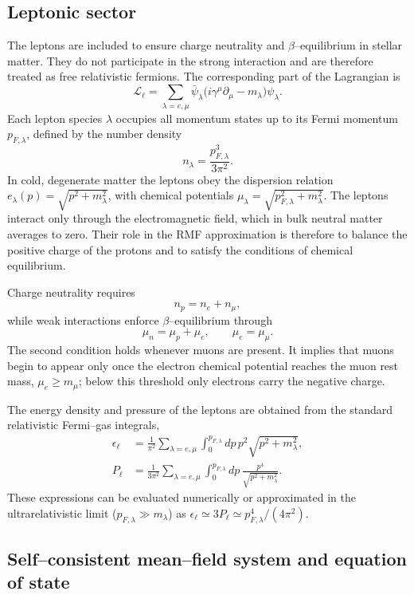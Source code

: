 \subsection*{Leptonic sector}
\label{subsec:leptons}

The leptons are included to ensure charge neutrality and
$\beta$–equilibrium in stellar matter. They do not participate in the strong
interaction and are therefore treated as free relativistic fermions. The
corresponding part of the Lagrangian is
\[
\mathcal{L}_{\ell}
= \sum_{\lambda=e,\mu}
  \bar{\psi}_{\lambda}\bigl(i\gamma^{\mu}\partial_{\mu}
  - m_{\lambda}\bigr)\psi_{\lambda}.
\]
Each lepton species $\lambda$ occupies all momentum states up to its Fermi
momentum $p_{F,\lambda}$, defined by the number density
\[
n_{\lambda} = \frac{p_{F,\lambda}^{3}}{3\pi^{2}}.
\]
In cold, degenerate matter the leptons obey the dispersion relation
$e_{\lambda}(p)=\sqrt{p^{2}+m_{\lambda}^{2}}$, with chemical potentials
$\mu_{\lambda}=\sqrt{p_{F,\lambda}^{2}+m_{\lambda}^{2}}$. The leptons interact
only through the electromagnetic field, which in bulk neutral matter averages
to zero. Their role in the RMF approximation is therefore to balance the
positive charge of the protons and to satisfy the conditions of chemical
equilibrium.

Charge neutrality requires
\[
n_{p} = n_{e} + n_{\mu},
\]
while weak interactions enforce $\beta$–equilibrium through
\[
\mu_{n} = \mu_{p} + \mu_{e}, \qquad
\mu_{e} = \mu_{\mu}.
\]
The second condition holds whenever muons are present. It implies that muons
begin to appear only once the electron chemical potential reaches the muon rest
mass, $\mu_{e} \ge m_{\mu}$; below this threshold
only electrons carry the negative charge.

The energy density and pressure of the leptons are obtained from the standard
relativistic Fermi–gas integrals,
\begin{align}
\epsilon_{\ell}
&= \frac{1}{\pi^{2}}\sum_{\lambda=e,\mu}
   \int_{0}^{p_{F,\lambda}}\!dp\,p^{2}\sqrt{p^{2}+m_{\lambda}^{2}},
\\[0.4em]
P_{\ell}
&= \frac{1}{3\pi^{2}}\sum_{\lambda=e,\mu}
   \int_{0}^{p_{F,\lambda}}\!dp\,\frac{p^{4}}{\sqrt{p^{2}+m_{\lambda}^{2}}}.
\end{align}
These expressions can be evaluated numerically or approximated in the
ultrarelativistic limit ($p_{F,\lambda}\!\gg\!m_{\lambda}$) as
$\epsilon_{\ell}\simeq3P_{\ell}\simeq p_{F,\lambda}^{4}/(4\pi^{2})$.

\subsection*{Self–consistent mean–field system and equation of state}
\label{subsec:rmf_selfconsistent}

